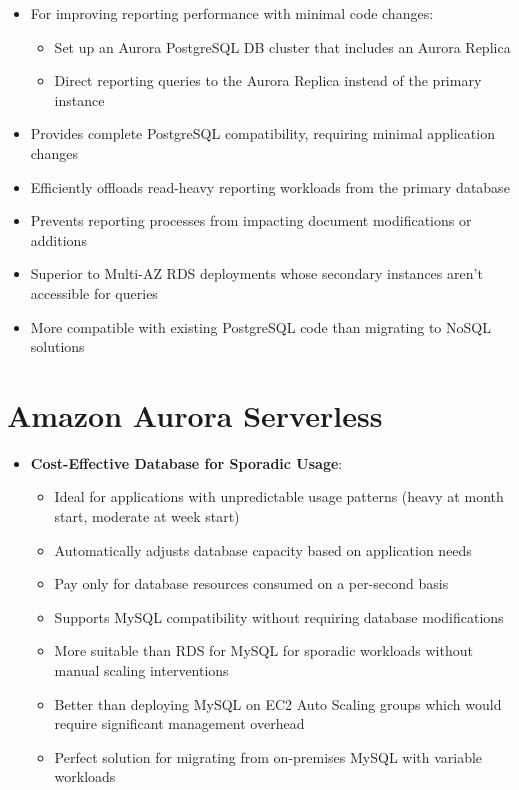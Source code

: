 \documentclass[11pt,a4paper]{report}
\begin{document}
\begin{itemize}
\begin{itemize}
  \item For improving reporting performance with minimal code changes:
\begin{itemize}
  \item Set up an Aurora PostgreSQL DB cluster that includes an Aurora Replica
  \item Direct reporting queries to the Aurora Replica instead of the primary instance
\end{itemize}
  \item Provides complete PostgreSQL compatibility, requiring minimal application changes
  \item Efficiently offloads read-heavy reporting workloads from the primary database
  \item Prevents reporting processes from impacting document modifications or additions
  \item Superior to Multi-AZ RDS deployments whose secondary instances aren't accessible for queries
  \item More compatible with existing PostgreSQL code than migrating to NoSQL solutions
\end{itemize}
\end{itemize}


\section{Amazon Aurora Serverless}

\begin{itemize}
  \item \textbf{Cost-Effective Database for Sporadic Usage}:
\begin{itemize}
  \item Ideal for applications with unpredictable usage patterns (heavy at month start, moderate at week start)
  \item Automatically adjusts database capacity based on application needs
  \item Pay only for database resources consumed on a per-second basis
  \item Supports MySQL compatibility without requiring database modifications
  \item More suitable than RDS for MySQL for sporadic workloads without manual scaling interventions
  \item Better than deploying MySQL on EC2 Auto Scaling groups which would require significant management overhead
  \item Perfect solution for migrating from on-premises MySQL with variable workloads
\end{itemize}
\end{itemize}
\end{document}
